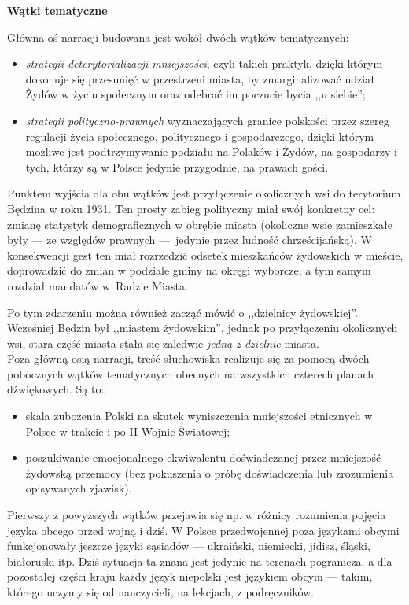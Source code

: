 \documentclass[11pt,a4paper,oneside]{article}
\begin{document}
\vspace{0.5cm}

\textbf{Wątki tematyczne}

Główna oś narracji budowana jest wokół dwóch wątków tematycznych:

\begin{itemize}
\item
  \emph{strategii deterytorializacji mniejszości}, czyli takich praktyk,
    dzięki którym dokonuje się przesunięć w przestrzeni miasta, by
    zmarginalizować udział Żydów w życiu społecznym oraz odebrać im poczucie
    bycia ,,u siebie'';
\item
  \emph{strategii polityczno-prawnych} wyznaczających granice polskości
  przez szereg regulacji życia społecznego, politycznego i gospodarczego,
  dzięki którym możliwe jest podtrzymywanie podziału na Polaków i Żydów,
  na gospodarzy i tych, którzy są w Polsce jedynie przygodnie, na prawach gości.
\end{itemize}

Punktem wyjścia dla obu wątków jest przyłączenie okolicznych wsi do terytorium
Będzina w roku 1931. Ten prosty zabieg polityczny miał swój konkretny cel:
zmianę statystyk demograficznych w obrębie miasta (okoliczne wsie zamieszkałe
były --- ze względów prawnych ---~jedynie przez ludność chrześcijańską).
W konsekwencji gest ten miał rozrzedzić odsetek mieszkańców żydowskich
w mieście, doprowadzić do zmian w podziale gminy na okręgi wyborcze, a tym
samym rozdział mandatów w~Radzie Miasta. 

\hspace{1em}Po tym zdarzeniu można również zacząć
mówić o ,,dzielnicy żydowskiej''. Wcześniej Będzin był ,,miastem żydowskim'',
jednak po przyłączeniu okolicznych wsi, stara część miasta stała się zaledwie
\emph{jedną z dzielnic} miasta. 
\\

Poza główną osią narracji, treść słuchowiska realizuje się za pomocą dwóch
pobocznych wątków tematycznych obecnych na wszystkich czterech planach
dźwiękowych. Są to: 
\begin{itemize}
\item
    skala zubożenia Polski na skutek wyniszczenia mniejszości etnicznych
    w Polsce w trakcie i po II Wojnie Światowej; 
\item
    poszukiwanie emocjonalnego ekwiwalentu doświadczanej przez mniejszość
    żydowską przemocy (bez pokuszenia o próbę doświadczenia lub zrozumienia
    opisywanych zjawisk).
\end{itemize}

Pierwszy z powyższych wątków przejawia się np. w różnicy rozumienia pojęcia
języka obcego przed wojną i dziś.  W Polsce przedwojennej poza językami obcymi
funkcjonowały jeszcze języki sąsiadów --- ukraiński, niemiecki, jidisz, śląski,
białoruski itp. Dziś sytuacja ta znana jest jedynie na terenach pogranicza,
a dla pozostałej części kraju każdy język niepolski jest językiem obcym ---
takim, którego uczymy się od nauczycieli, na lekcjach, z podręczników. 
\end{document}
